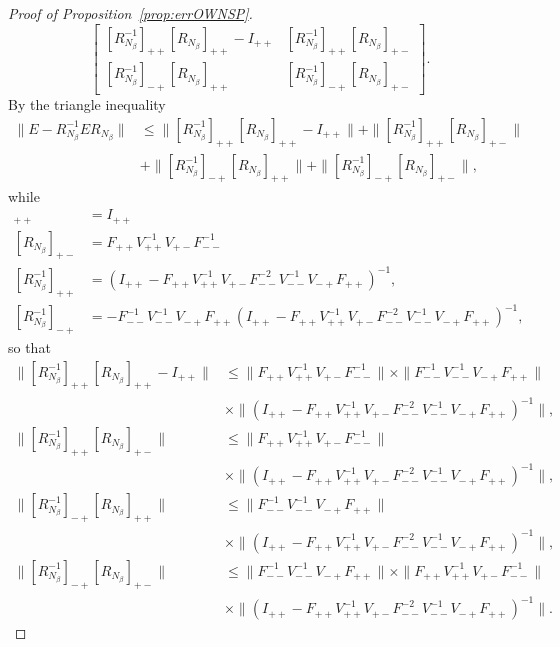 \begin{proof}[Proof of Proposition~\ref{prop:errOWNSP}]
\[\begin{bmatrix}
            [R_{N_\beta}^{-1}]_{++}[R_{N_\beta}]_{++} - I_{++} &
            [R_{N_\beta}^{-1}]_{++}[R_{N_\beta}]_{+-}\\
            [R_{N_\beta}^{-1}]_{-+}[R_{N_\beta}]_{++} &
            [R_{N_\beta}^{-1}]_{-+}[R_{N_\beta}]_{+-}
        \end{bmatrix}.
    \]
    By the triangle inequality
    \begin{align*}
    \|E-R_{N_\beta}^{-1}E R_{N_\beta}\|
    &\leq
    \|[R_{N_\beta}^{-1}]_{++}[R_{N_\beta}]_{++} - I_{++}\|
    +\|[R_{N_\beta}^{-1}]_{++}[R_{N_\beta}]_{+-}\|\\
    &+\|[R_{N_\beta}^{-1}]_{-+}[R_{N_\beta}]_{++}\|
    +\|[R_{N_\beta}^{-1}]_{-+}[R_{N_\beta}]_{+-}\|,
    \end{align*}
    while
    \begin{align*}
        [R_{N_\beta}]_{++}&=I_{++}\\
        [R_{N_\beta}]_{+-}&=F_{++}V_{++}^{-1}V_{+-}F_{--}^{-1}\\
        [R_{N_\beta}^{-1}]_{++}&=(I_{++}-F_{++}V_{++}^{-1}V_{+-}F_{--}^{-2}V_{--}^{-1}V_{-+}F_{++})^{-1},\\
        [R_{N_\beta}^{-1}]_{-+}&=-F_{--}^{-1}V_{--}^{-1}V_{-+}F_{++}(I_{++}-F_{++}V_{++}^{-1}V_{+-}F_{--}^{-2}V_{--}^{-1}V_{-+}F_{++})^{-1},
    \end{align*}
    so that
    \begin{align*}
        \|[R_{N_\beta}^{-1}]_{++}[R_{N_\beta}]_{++}-I_{++}\|
        &\leq
        \|F_{++}V_{++}^{-1}V_{+-}F_{--}^{-1}\|\times\|F_{--}^{-1}V_{--}^{-1}V_{-+}F_{++}\|
        \\
        &\times\|(I_{++}-F_{++}V_{++}^{-1}V_{+-}F_{--}^{-2}V_{--}^{-1}V_{-+}F_{++})^{-1}\|,\\
        \|[R_{N_\beta}^{-1}]_{++}[R_{N_\beta}]_{+-}\|
        &\leq
        \|F_{++}V_{++}^{-1}V_{+-}F_{--}^{-1}\|\\
        &\times
        \|(I_{++}-F_{++}V_{++}^{-1}V_{+-}F_{--}^{-2}V_{--}^{-1}V_{-+}F_{++})^{-1}\|,\\
        \|[R_{N_\beta}^{-1}]_{-+}[R_{N_\beta}]_{++}\|
        &\leq\|F_{--}^{-1}V_{--}^{-1}V_{-+}F_{++}\|\\
        &\times\|(I_{++}-F_{++}V_{++}^{-1}V_{+-}F_{--}^{-2}V_{--}^{-1}V_{-+}F_{++})^{-1}\|,\\
        \|[R_{N_\beta}^{-1}]_{-+}[R_{N_\beta}]_{+-}\|
        &\leq\|F_{--}^{-1}V_{--}^{-1}V_{-+}F_{++}\|
        \times\|F_{++}V_{++}^{-1}V_{+-}F_{--}^{-1}\|\\
        &\times\|(I_{++}-F_{++}V_{++}^{-1}V_{+-}F_{--}^{-2}V_{--}^{-1}V_{-+}F_{++})^{-1}\|.

\end{align*}
\end{proof}
